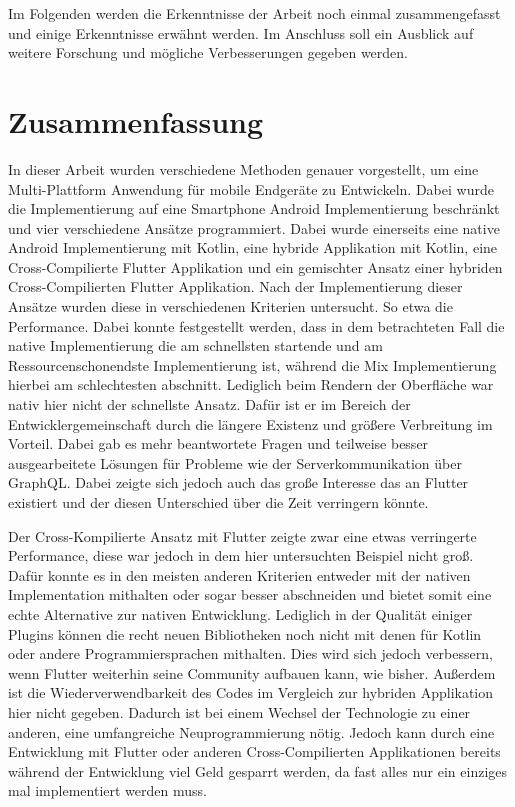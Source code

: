 Im Folgenden werden die Erkenntnisse der Arbeit noch einmal zusammengefasst und einige Erkenntnisse erwähnt werden. Im Anschluss soll ein Ausblick auf weitere Forschung und mögliche Verbesserungen gegeben werden.

\section{Zusammenfassung}
In dieser Arbeit wurden verschiedene Methoden genauer vorgestellt, um eine Multi-Plattform Anwendung für mobile Endgeräte zu Entwickeln. Dabei wurde die Implementierung auf eine Smartphone Android Implementierung beschränkt und vier verschiedene Ansätze programmiert. Dabei wurde einerseits eine native Android Implementierung mit Kotlin, eine hybride Applikation mit Kotlin, eine Cross-Compilierte Flutter Applikation und ein gemischter Ansatz einer hybriden Cross-Compilierten Flutter Applikation. Nach der Implementierung dieser Ansätze wurden diese in verschiedenen Kriterien untersucht. So etwa die Performance. Dabei konnte festgestellt werden, dass in dem betrachteten Fall die native Implementierung die am schnellsten startende und am Ressourcenschonendste Implementierung ist, während die Mix Implementierung hierbei am schlechtesten abschnitt. Lediglich beim Rendern der Oberfläche war nativ hier nicht der schnellste Ansatz. Dafür ist er im Bereich der Entwicklergemeinschaft durch die längere Existenz und größere Verbreitung im Vorteil. Dabei gab es mehr beantwortete Fragen und teilweise besser ausgearbeitete Lösungen für Probleme wie der Serverkommunikation über GraphQL. Dabei zeigte sich jedoch auch das große Interesse das an Flutter existiert und der diesen Unterschied über die Zeit verringern könnte.

Der Cross-Kompilierte Ansatz mit Flutter zeigte zwar eine etwas verringerte Performance, diese war jedoch in dem hier untersuchten Beispiel nicht groß. Dafür konnte es in den meisten anderen Kriterien entweder mit der nativen Implementation mithalten oder sogar besser abschneiden und bietet somit eine echte Alternative zur nativen Entwicklung. Lediglich in der Qualität einiger Plugins können die recht neuen Bibliotheken noch nicht mit denen für Kotlin oder andere Programmiersprachen mithalten. Dies wird sich jedoch verbessern, wenn Flutter weiterhin seine Community aufbauen kann, wie bisher. Außerdem ist die Wiederverwendbarkeit des Codes im Vergleich zur hybriden Applikation hier nicht gegeben. Dadurch ist bei einem Wechsel der Technologie zu einer anderen, eine umfangreiche Neuprogrammierung nötig.
Jedoch kann durch eine Entwicklung mit Flutter oder anderen Cross-Compilierten Applikationen bereits während der Entwicklung viel Geld gesparrt werden, da fast alles nur ein einziges mal implementiert werden muss.


